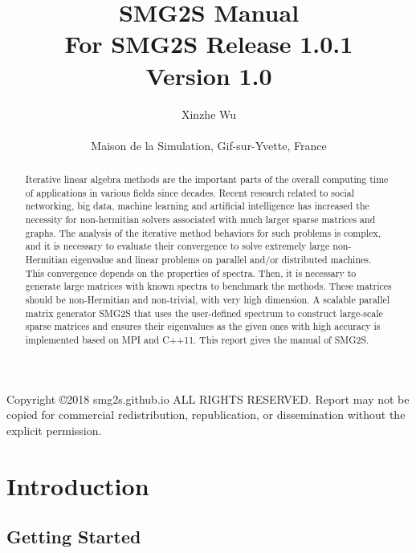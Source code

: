 \documentclass[a4paper, 10 pt]{report}
\title{{\Huge SMG2S Manual}\\
	\vspace{1cm}
	\large {For SMG2S Release 1.0.1} \\
	\vspace{2cm}
	\Large	Version 1.0\\}
\author{
	\Large Xinzhe Wu\\
	~\\
	Maison de la Simulation, Gif-sur-Yvette, France
}
\begin{document}
	\maketitle
	\pagestyle{empty}
	Copyright \copyright 2018 smg2s.github.io ALL RIGHTS RESERVED.
	Report may not be copied for commercial redistribution, republication, or dissemination without the explicit permission.
	
	\begin{abstract}
	Iterative linear algebra methods are the important parts of the overall computing time of applications in various fields since decades. Recent research related to social networking, big data, machine learning and artificial intelligence has increased the necessity for non-hermitian solvers associated with much larger sparse matrices and graphs. The analysis of the iterative method behaviors for such problems is complex, and it is necessary to evaluate their convergence to solve extremely large non-Hermitian eigenvalue and linear problems on parallel and/or distributed machines. This convergence depends on the properties of spectra. Then, it is necessary to generate large matrices with known spectra to benchmark the methods. These matrices should be non-Hermitian and non-trivial, with very high dimension. A scalable parallel matrix generator SMG2S that uses the user-defined spectrum to construct large-scale sparse matrices and ensures their eigenvalues as the given ones with high accuracy is implemented based on MPI and C++11. This report gives the manual of SMG2S.
	\end{abstract}
	\newpage
	\thispagestyle{empty}
	\mbox{}
	\tableofcontents
	\newpage
	\thispagestyle{empty}
	\mbox{}
	
	\pagestyle{myheadings}
	
	\chapter{Introduction}
	
	\section{Getting Started}
\end{document}
